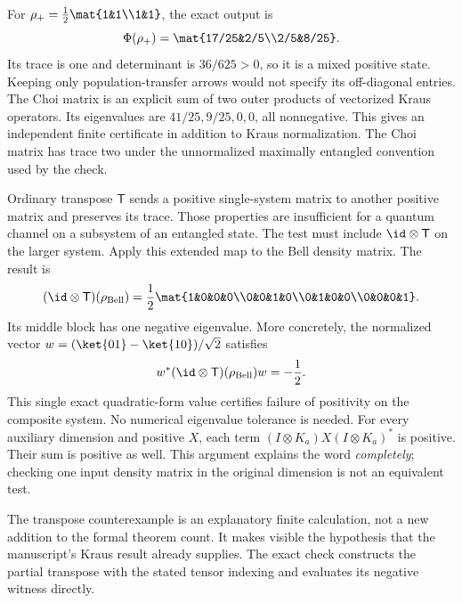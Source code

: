 For $\rho_+=\frac12\mat{1&1\\1&1}$, the exact output is
\[
\Phi(\rho_+)=\mat{17/25&2/5\\2/5&8/25}.
\]
Its trace is one and determinant is $36/625>0$, so it is a mixed positive state. Keeping only population-transfer arrows would not specify its off-diagonal entries.
The Choi matrix is an explicit sum of two outer products of vectorized Kraus operators. Its eigenvalues are $41/25,9/25,0,0$, all nonnegative. This gives an independent finite certificate in addition to Kraus normalization. The Choi matrix has trace two under the unnormalized maximally entangled convention used by the check.

Ordinary transpose $\mathsf T$ sends a positive single-system matrix to another positive matrix and preserves its trace. Those properties are insufficient for a quantum channel on a subsystem of an entangled state. The test must include $\id\otimes\mathsf T$ on the larger system.
Apply this extended map to the Bell density matrix. The result is
\[
(\id\otimes\mathsf T)(\rho_{\rm Bell})
=\frac12\mat{1&0&0&0\\0&0&1&0\\0&1&0&0\\0&0&0&1}.
\]
Its middle block has one negative eigenvalue. More concretely, the normalized vector $w=(\ket{01}-\ket{10})/\sqrt2$ satisfies
\[
w^*(\id\otimes\mathsf T)(\rho_{\rm Bell})w=-\frac12.
\]
This single exact quadratic-form value certifies failure of positivity on the composite system. No numerical eigenvalue tolerance is needed.
For every auxiliary dimension and positive $X$, each term $(I\otimes K_a)X(I\otimes K_a)^*$ is positive. Their sum is positive as well. This argument explains the word \emph{completely}; checking one input density matrix in the original dimension is not an equivalent test.

The transpose counterexample is an explanatory finite calculation, not a new addition to the formal theorem count. It makes visible the hypothesis that the manuscript's Kraus result already supplies. The exact check constructs the partial transpose with the stated tensor indexing and evaluates its negative witness directly.

